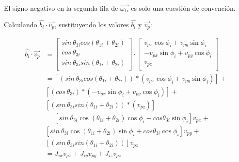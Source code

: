             El signo negativo en la segunda fila de  $\overrightarrow{ \omega _{1i}}$ es solo una cuestión de convención. 

            \newpage
            
            Calculando  $\widehat{b_{i}} \cdot \overrightarrow{v_{p}}$,  sustituyendo los valores $\widehat{b_{i}}$ y  $\overrightarrow{v_{p}}$:

            \begin{align*}
                  \widehat{b_{i}} \cdot \overrightarrow{v_{p}} &= \left[ \begin{matrix}
                    sin~ \theta _{3i}cos⁡ \left(  \theta _{1i}+ \theta _{2i} \right) \\
                    cos~ \theta _{3i}\\
                    sin~ \theta _{3i}sin \left(  \theta _{1i}+ \theta _{2i} \right) \\
                    \end{matrix}
                     \right]  \cdot  \left[ \begin{matrix}
                    v_{px}\cos  \phi _{i}+v_{py}\sin  \phi _{i}\\
                    -v_{px}\sin  \phi _{i}+v_{py}\cos  \phi _{i}\\
                    v_{pz}\\
                    \end{matrix}
                     \right]\\
                 &= \left[  \left( sin~ \theta _{3i}cos⁡ \left(  \theta _{1i}+ \theta _{2i} \right)  \right) \ast \left( v_{px}\cos  \phi _{i}+v_{py}\sin  \phi _{i} \right)  \right] +\\
                 ~~ &\left[  \left( cos~ \theta _{3i} \right) \ast \left( -v_{px}\sin  \phi _{i}+v_{py}\cos  \phi _{i} \right)  \right] +\\
                 ~~~&\left[  \left( sin~ \theta _{3i}sin \left(  \theta _{1i}+ \theta _{2i} \right)  \right) \ast \left( v_{pz} \right)  \right] \\
                 &= \left[ sin~ \theta _{3i}\cos  \left(  \theta _{1i}+ \theta _{2i} \right) \cos  \phi _{i}-cos  \theta _{3i}\sin  \phi _{i} \right] v_{px}+\\
                 ~~~&\left[ sin~ \theta _{3i}\cos  \left(  \theta _{1i}+ \theta _{2i} \right) \sin  \phi _{i}+ cos  \theta _{3i}\cos  \phi _{i} \right] v_{py}+\\ 
                 ~~~&\left[  \left( sin~ \theta _{3i}sin \left(  \theta _{1i}+ \theta _{2i} \right)  \right)  \right] v_{pz} \\
                 &=J_{ix}v_{px}+J_{iy}v_{py}+J_{iz}v_{pz} 
            \end{align*}
            
